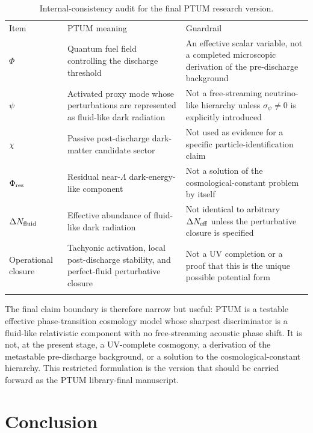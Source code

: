 \documentclass[epj]{svjour}
\begin{document}
\begin{table}[t]
\caption{Internal-consistency audit for the final PTUM research version.}
\label{tab:ptum_final_audit}
\centering
\begin{tabular}{p{}p{}p{}}
\hline\noalign{\smallskip}
Item & PTUM meaning & Guardrail \\
\noalign{\smallskip}\hline\noalign{\smallskip}
$\Phi$ & Quantum fuel field controlling the discharge threshold & An effective scalar variable, not a completed microscopic derivation of the pre-discharge background \\
$\psi$ & Activated proxy mode whose perturbations are represented as fluid-like dark radiation & Not a free-streaming neutrino-like hierarchy unless $\sigma_\psi\neq0$ is explicitly introduced \\
$\chi$ & Passive post-discharge dark-matter candidate sector & Not used as evidence for a specific particle-identification claim \\
$\Phi_{\rm res}$ & Residual near-$\Lambda$ dark-energy-like component & Not a solution of the cosmological-constant problem by itself \\
$\Delta N_{\rm fluid}$ & Effective abundance of fluid-like dark radiation & Not identical to arbitrary $\Delta N_{\rm eff}$ unless the perturbative closure is specified \\
Operational closure & Tachyonic activation, local post-discharge stability, and perfect-fluid perturbative closure & Not a UV completion or a proof that this is the unique possible potential form \\
\noalign{\smallskip}\hline
\end{tabular}
\end{table}

The final claim boundary is therefore narrow but useful: PTUM is a testable
effective phase-transition cosmology model whose sharpest discriminator is a
fluid-like relativistic component with no free-streaming acoustic phase shift.
It is not, at the present stage, a UV-complete cosmogony, a derivation of the
metastable pre-discharge background, or a solution to the cosmological-constant
hierarchy.  This restricted formulation is the version that should be carried
forward as the PTUM library-final manuscript.

\section{Conclusion}
\label{sec:conclusion}
\end{document}

